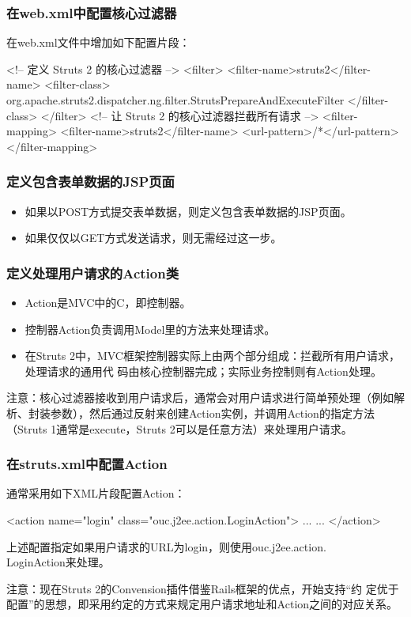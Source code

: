 \begin{frame}[fragile] %
\frametitle{ 在web.xml中配置核心过滤器}

在web.xml文件中增加如下配置片段：

\begin{xmlCode}
<!-- 定义 Struts 2 的核心过滤器 -->
<filter>
  <filter-name>struts2</filter-name>
  <filter-class>
    org.apache.struts2.dispatcher.ng.filter.StrutsPrepareAndExecuteFilter
  </filter-class>
</filter>
<!-- 让 Struts 2 的核心过滤器拦截所有请求 -->
<filter-mapping>
  <filter-name>struts2</filter-name>
  <url-pattern>/*</url-pattern>
</filter-mapping>  
\end{xmlCode}

\end{frame}

\begin{frame}[fragile] %
\frametitle{ 定义包含表单数据的JSP页面}

\begin{itemize}
\item 如果以POST方式提交表单数据，则定义包含表单数据的JSP页面。
\item 如果仅仅以GET方式发送请求，则无需经过这一步。
\end{itemize}
\end{frame}

\begin{frame}[fragile] %
\frametitle{ 定义处理用户请求的Action类}

\begin{itemize}
\item Action是MVC中的C，即控制器。
\item 控制器Action负责调用Model里的方法来处理请求。
\item 在Struts 2中，MVC框架控制器实际上由两个部分组成：拦截所有用户请求，处理请求的通用代
  码由核心控制器完成；实际业务控制则有Action处理。
\end{itemize}

{\Blue\kai\scriptsize 注意：核心过滤器接收到用户请求后，通常会对用户请求进行简单预处理（例如解析、封装参数），然后通过反射来创建Action实例，并调用Action的指定方法（Struts 1通常是execute，Struts 2可以是任意方法）来处理用户请求。}
\end{frame}

\begin{frame}[fragile] %
\frametitle{ 在struts.xml中配置Action}

通常采用如下XML片段配置Action：
\begin{xmlCode}
<action name="login" class="ouc.j2ee.action.LoginAction">
  ... ...
</action>
\end{xmlCode}
上述配置指定如果用户请求的URL为login，则使用ouc.j2ee.action.\\LoginAction来处理。

{\Blue\kai\scriptsize 注意：现在Struts 2的Convension插件借鉴Rails框架的优点，开始支持“约
  定优于配置”的思想，即采用约定的方式来规定用户请求地址和Action之间的对应关系。}
\end{frame}

